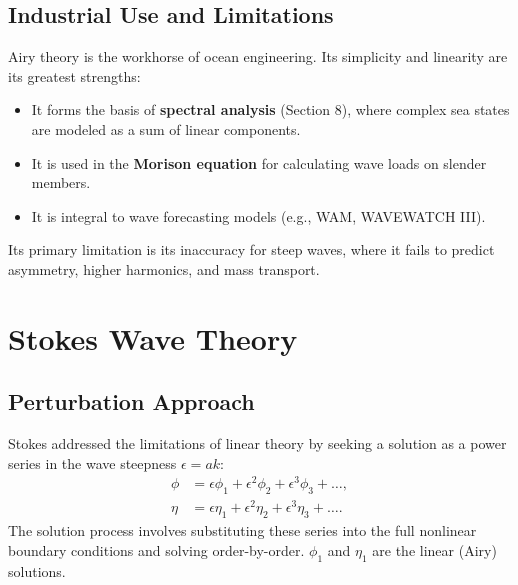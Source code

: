 \documentclass[11pt,letterpaper]{article}
\begin{document}
    \subsection{Industrial Use and Limitations}
    Airy theory is the workhorse of ocean engineering. Its simplicity and linearity are its greatest strengths:
    \begin{itemize}
        \item It forms the basis of \textbf{spectral analysis} (Section 8), where complex sea states are modeled as a sum of linear components.
        \item It is used in the \textbf{Morison equation} for calculating wave loads on slender members.
        \item It is integral to wave forecasting models (e.g., WAM, WAVEWATCH III).
    \end{itemize}
    Its primary limitation is its inaccuracy for steep waves, where it fails to predict asymmetry, higher harmonics, and mass transport.

    \section{Stokes Wave Theory}
    \subsection{Perturbation Approach}
    Stokes addressed the limitations of linear theory by seeking a solution as a power series in the wave steepness $\epsilon = ak$:
    \begin{align}
        \phi &= \epsilon \phi_1 + \epsilon^2 \phi_2 + \epsilon^3 \phi_3 + \dots, \\
        \eta &= \epsilon \eta_1 + \epsilon^2 \eta_2 + \epsilon^3 \eta_3 + \dots.
    \end{align}
    The solution process involves substituting these series into the full nonlinear boundary conditions and solving order-by-order. $\phi_1$ and $\eta_1$ are the linear (Airy) solutions.
\end{document}
